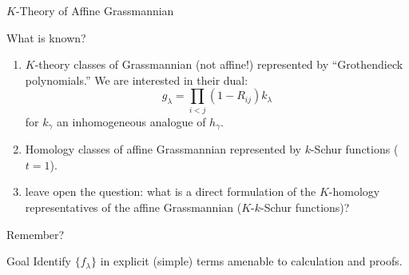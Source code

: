\documentclass{beamer}
\theoremstyle{definition}
\begin{document}
\begin{frame}{\(K\)-Theory of Affine Grassmannian}
  \begin{block}{What is known?}
  \pause
    \begin{enumerate}
    \item \(K\)-theory classes of Grassmannian (not affine!)
      represented by
      ``Grothendieck 
      polynomials.'' We are interested in their dual: \[
        g_\lambda = \prod_{i < j} (1-R_{ij}) k_\lambda
      \]
      for \(k_\gamma\) an inhomogeneous analogue of \(h_\gamma\).\pause
    \item Homology classes of affine Grassmannian represented by
      \(k\)-Schur functions (\(t=1\)).\pause
    \item \cite{lss} leave open the question: what is a direct formulation of the \(K\)-homology representatives of the affine Grassmannian (\(K\)-\(k\)-Schur functions)?
    \end{enumerate}
  \end{block}
\end{frame}
\begin{frame}{Remember?}
  \begin{alertblock}{Goal}
    Identify \(\{f_\lambda\}\) in explicit (simple) terms amenable to
    calculation and proofs.
  \end{alertblock}  
\end{frame}
\end{document}
